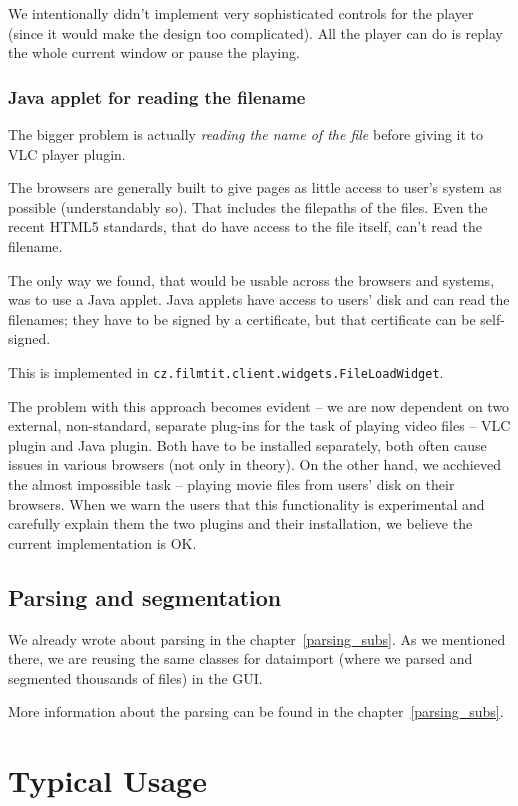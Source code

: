 We intentionally didn't implement very sophisticated controls for the player (since it would make the design too complicated). All the player can do is replay the whole current window or pause the playing.

\subsubsection*{Java applet for reading the filename}
The bigger problem is actually \emph{reading the name of the file} before giving it to VLC player plugin.

The browsers are generally built to give pages as little access to user's system as possible (understandably so). That includes the filepaths of the files. Even the recent HTML5 standards, that do have access to the file itself, can't read the filename.

The only way we found, that would be usable across the browsers and systems, was to use a Java applet. Java applets have access to users' disk and can read the filenames; they have to be signed by a certificate, but that certificate can be self-signed.

This is implemented in \texttt{cz.filmtit.client.widgets.FileLoadWidget}.

The problem with this approach becomes evident -- we are now dependent on two external, non-standard, separate plug-ins for the task of playing video files -- VLC plugin and Java plugin. Both have to be installed separately, both often cause issues in various browsers (not only in theory). On the other hand, we acchieved the almost impossible task -- playing movie files from users' disk on their browsers. When we warn the users that this functionality is experimental and carefully explain them the two plugins and their installation, we believe the current implementation is OK.


\subsection{Parsing and segmentation}
We already wrote about parsing in the chapter~\ref{parsing_subs}. As we mentioned there, we are reusing the same classes for dataimport (where we parsed and segmented thousands of files) in the GUI.

More information about the parsing can be found in the chapter~\ref{parsing_subs}.

\section{Typical Usage}


